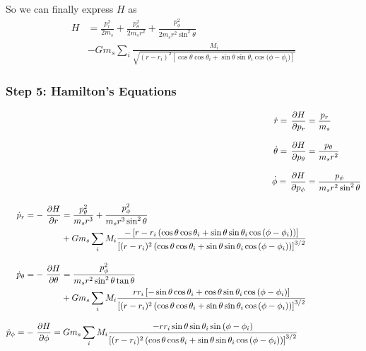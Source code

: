 So we can finally express \(H\) as
\begin{equation}
    \begin{aligned}
        H &= \frac{p_r^2}{2 m_s} + \frac{p_\theta^2}{2 m_s r^2} + \frac{p_\phi^2}{2 m_s r^2 \sin^2{\theta}} \\
        &- G m_s \sum\limits_{i} \frac{M_i}{\sqrt{(r - r_i)^2\left[\cos{\theta}\cos{\theta_i}+\sin{\theta}\sin{\theta_i}\cos{(\phi - \phi_i})\right]}}
    \end{aligned}
\end{equation}

\subsubsection{Step 5: Hamilton's Equations}
\begin{align}
    \dot{r} = \operatorname{}\frac{\partial H}{\partial p_r} &= \frac{p_r}{m_s} \label{eq:rdot} \\[0.3cm]
    \dot{\theta} = \operatorname{}\frac{\partial H}{\partial p_\theta} &= \frac{p_\theta}{m_s r^2} \label{eq:thetadot} \\[0.3cm]
    \dot{\phi} = \operatorname{}\frac{\partial H}{\partial p_\phi} &= \frac{p_\phi}{m_s r^2 \sin^2{\theta}} \label{eq:phidot}  \\[0.3cm]
    \begin{split}
        \dot{p}_r = -\operatorname{}\frac{\partial H}{\partial r} &= \frac{p_\theta^2}{m_s r^3} + \frac{p_\phi^2}{m_s r^3 \sin^2{\theta} } \\
        &+ G m_s \sum\limits_{i} M_i \frac{-\left[r - r_i \left(\cos{\theta}\cos{\theta_i} + \sin{\theta}\sin{\theta_i}\cos{(\phi - \phi_i)}\right) \right]}{\left[(r - r_i)^2 \left(\cos{\theta}\cos{\theta_i} + \sin{\theta}\sin{\theta_i}\cos{(\phi - \phi_i)} \right) \right]^{3/2}} \label{eq:prdot}
    \end{split} \\[0.3cm]
    \begin{split}
        \dot{p}_\theta = -\operatorname{}\frac{\partial H}{\partial \theta} &= \frac{p_\phi^2}{m_s r^2 \sin^2{\theta} \tan{\theta}} \\
        &+ G m_s \sum\limits_{i} M_i \frac{r r_i \left[-\sin{\theta}\cos{\theta_i} + \cos{\theta}\sin{\theta_i}\cos{(\phi - \phi_i)} \right]}{\left[(r - r_i)^2 \left(\cos{\theta}\cos{\theta_i} + \sin{\theta}\sin{\theta_i}\cos{(\phi - \phi_i)} \right) \right]^{3/2}} \label{eq:pthetadot}
    \end{split} \\[0.3cm]
    \begin{split}
        \dot{p}_\phi = -\operatorname{}\frac{\partial H}{\partial \phi} &= G m_s \sum\limits_{i} M_i \frac{- r r_i \sin{\theta}\sin{\theta_i}\sin{(\phi - \phi_i)}}{\left[(r - r_i)^2 \left(\cos{\theta}\cos{\theta_i} + \sin{\theta}\sin{\theta_i}\cos{(\phi - \phi_i)} \right) \right]^{3/2}} \label{eq:pphidot}
    \end{split}
\end{align}

